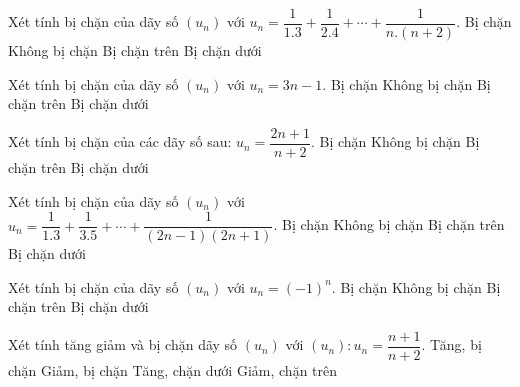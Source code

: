 \begin{ex}%
	Xét tính bị chặn của dãy số $(u_n)$ với $u_n=\dfrac{1}{1.3}+\dfrac{1}{2.4}+\cdots +\dfrac{1}{n.(n+2)}$. 
	\choice 
		{\True Bị  chặn}
		{Không bị chặn} 
		{Bị  chặn trên}
		{Bị chặn  dưới}
\end{ex}

\begin{ex}%
	Xét tính bị chặn của dãy số  $(u_n)$ với $u_n=3n-1$.
	\choice 
		{Bị  chặn}
		{Không  bị chặn}
		{Bị chặn trên} 
		{\True Bị  chặn dưới}
\end{ex}

\begin{ex}%
	 Xét tính bị chặn của các dãy số sau: $u_n=\dfrac{2n+1}{n+2}$.
	\choice 
		{\True Bị chặn} 
		{Không bị chặn} 
		{Bị chặn trên} 
		{Bị chặn  dưới}
\end{ex}

\begin{ex}%
	Xét  tính bị chặn của dãy số $(u_n)$ với $u_n=\dfrac{1}{1.3}+\dfrac{1}{3.5}+\cdots +\dfrac{1}{(2n-1)(2n+1)}$.
	\choice 
		{\True Bị chặn} 
		 {Không bị chặn}
		 {Bị chặn trên}
		{Bị chặn  dưới}
\end{ex}

\begin{ex}%
	Xét tính bị chặn của dãy số $(u_n)$ với  $u_n=(-1)^n$.
	\choice 
		{\True Bị  chặn}
		 {Không bị chặn}
		{Bị chặn trên} 
		{Bị chặn dưới} 
\end{ex}

\begin{ex}%
	Xét tính tăng giảm và bị chặn dãy số $(u_n)$ với $(u_n) \colon u_n=\dfrac{n+1}{n+2}$. 
	 \choice
		{\True Tăng,  bị chặn}
		 {Giảm, bị chặn}
		{Tăng, chặn dưới} 
		{Giảm, chặn trên} 
\end{ex}


